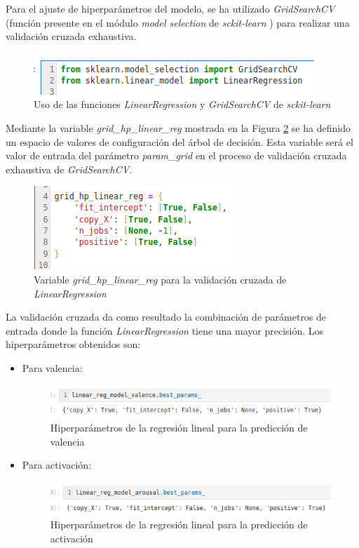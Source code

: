 \documentclass[12pt,a4paper,Spanish]{article}
\begin{document}
Para el ajuste de hiperparámetros del modelo, se ha utilizado \textit{GridSearchCV} (función presente en el módulo \textit{model selection} de \textit{sckit-learn} \cite{scikit-learn}) para realizar una validación cruzada exhaustiva.
\begin{figure}[H]
	\centering
	\includegraphics[width=0.7\linewidth]{figs/import_linear_reg}
	\caption{Uso de las funciones \textit{LinearRegression} y \textit{GridSearchCV} de \textit{sckit-learn}}
	\label{fig:importlinearreg}
\end{figure}
Mediante la variable \textit{grid\_hp\_linear\_reg} mostrada en la Figura \ref{fig:paramslinearreg} se ha definido un espacio de valores de configuración del árbol de decisión. Esta variable será el valor de entrada del parámetro \textit{param\_grid} en el proceso de validación cruzada exhaustiva de \textit{GridSearchCV}.
\begin{figure}[H]
	\centering
	\includegraphics[width=0.7\linewidth]{figs/params_linear_reg}
	\caption{Variable \textit{grid\_hp\_linear\_reg} para la validación cruzada de \textit{LinearRegression}}
	\label{fig:paramslinearreg}
\end{figure}
La validación cruzada da como resultado la combinación de parámetros de entrada donde la función \textit{LinearRegression} tiene una mayor precisión. Los hiperparámetros obtenidos son:
\begin{itemize}
	\item Para valencia:
	\begin{figure}[H]
		\centering
		\includegraphics[width=0.7\linewidth]{figs/final_params_linear_valence}
		\caption{Hiperparámetros de la regresión lineal para la predicción de valencia}
		\label{fig:finalparamslinearvalence}
	\end{figure}
	\item Para activación:
	\begin{figure}[H]
		\centering
		\includegraphics[width=0.7\linewidth]{figs/final_params_linear_arousal}
		\caption{Hiperparámetros de la regresión lineal para la predicción de activación}
		\label{fig:finalparamslineararousal}
	\end{figure}
\end{itemize}
\end{document}
